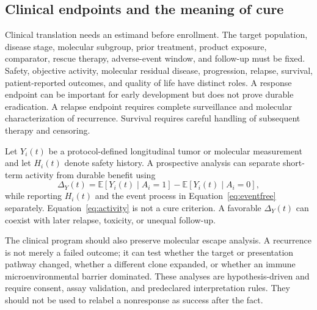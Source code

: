 \documentclass[10pt,conference]{IEEEtran}
\begin{document}
\subsection{Clinical endpoints and the meaning of cure}
Clinical translation needs an estimand before enrollment. The target population, disease stage, molecular subgroup, prior treatment, product exposure, comparator, rescue therapy, adverse-event window, and follow-up must be fixed. Safety, objective activity, molecular residual disease, progression, relapse, survival, patient-reported outcomes, and quality of life have distinct roles. A response endpoint can be important for early development but does not prove durable eradication. A relapse endpoint requires complete surveillance and molecular characterization of recurrence. Survival requires careful handling of subsequent therapy and censoring.

Let $Y_i(t)$ be a protocol-defined longitudinal tumor or molecular measurement and let $H_i(t)$ denote safety history. A prospective analysis can separate short-term activity from durable benefit using
\begin{equation}
\Delta_Y(t)=\mathbb{E}[Y_i(t)\mid A_i=1]-\mathbb{E}[Y_i(t)\mid A_i=0],\label{eq:activity}
\end{equation}
while reporting $H_i(t)$ and the event process in Equation~\eqref{eq:eventfree} separately. Equation~\eqref{eq:activity} is not a cure criterion. A favorable $\Delta_Y(t)$ can coexist with later relapse, toxicity, or unequal follow-up.

The clinical program should also preserve molecular escape analysis. A recurrence is not merely a failed outcome; it can test whether the target or presentation pathway changed, whether a different clone expanded, or whether an immune microenvironmental barrier dominated. These analyses are hypothesis-driven and require consent, assay validation, and predeclared interpretation rules. They should not be used to relabel a nonresponse as success after the fact.
\end{document}
